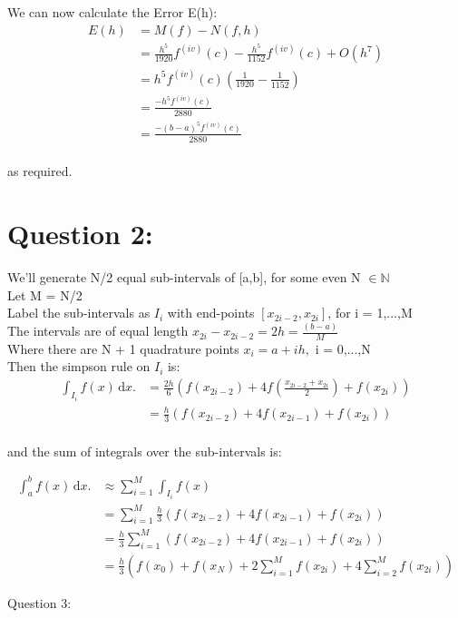 \documentclass[fleqn]{report}
\begin{document}
We can now calculate the Error E(h):
\begin{equation}
\begin{split}
E(h) & =M(f) - N(f,h)\\
& = \frac{h^5}{1920}f^{(iv)}(c) -  \frac{h^5}{1152}f^{(iv)}(c) + O(h^7) \\
& = h^5f^{(iv)}(c)(\frac{1}{1920} - \frac{1}{1152})\\
& = \frac{-h^5f^{(iv)}(c)}{2880}\\
& = \frac{-(b-a)^5f^{(iv)}(c)}{2880}
\end{split}
\end{equation}
\\
as required.

\section{Question 2:}
We'll generate N/2 equal sub-intervals of [a,b], for some even N $\in \mathbb{N}$\\
Let M = N/2\\
Label the sub-intervals as $I_{i}$ with end-points $[x_{2i-2}, x_{2i}]$, for i = 1,...,M\\
The intervals are of equal length $x_{2i} - x_{2i-2} = 2h = \frac{(b - a)}{M}$\\
Where there are N + 1 quadrature points $x_{i} = a + ih,$ i = 0,...,N
\\
Then the simpson rule on $I_{i}$ is:
\begin{equation}
\begin{split}
\int_{I_i} \! f(x) \, \mathrm{d}x. & = \frac{2h}{6}
(f(x_{2i-2}) + 4f(\frac{x_{2i-2} + x_{2i}}{2}) + f(x_{2i}))\\
& = \frac{h}{3}(f(x_{2i-2}) + 4f(x_{2i-1}) + f(x_{2i}))
\end{split}
\end{equation}
\\
and the sum of integrals over the sub-intervals is:

\begin{equation}
\begin{split}
\int_a^b \! f(x) \,\mathrm{d}x. & \approx  \sum_{i=1}^{M} \int_{I_i} \! f(x) \,\\
& = \sum_{i=1}^{M} \frac{h}{3}(f(x_{2i-2}) + 4f(x_{2i-1}) + f(x_{2i}))\\
& = \frac{h}{3} \sum_{i=1}^{M} (f(x_{2i-2}) + 4f(x_{2i-1}) + f(x_{2i}))\\
& = \frac{h}{3} (f(x_0) + f(x_N) +  2\sum_{i=1}^{M} f(x_{2i}) + 4\sum_{i=2}^{M} f(x_{2i}))
\end{split}
\end{equation}    



Question 3:
\end{document}
